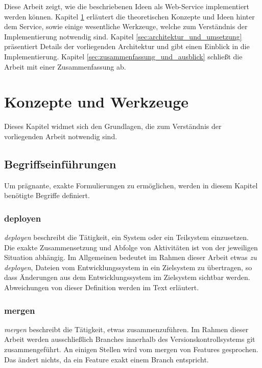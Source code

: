 Diese Arbeit zeigt, wie die beschriebenen Ideen als Web-Service implementiert werden können. Kapitel \ref{sec:konzepte_und_werkzeuge} erläutert die theoretischen Konzepte und Ideen hinter dem Service, sowie einige wesentliche Werkzeuge, welche zum Verständnis der Implementierung notwendig sind. Kapitel \ref{sec:architektur_und_umsetzung} präsentiert Details der vorliegenden Architektur und gibt einen Einblick in die Implementierung. Kapitel \ref{sec:zusammenfassung_und_ausblick} schließt die Arbeit mit einer Zusammenfassung ab.


\section{Konzepte und Werkzeuge} %
\label{sec:konzepte_und_werkzeuge}

Dieses Kapitel widmet sich den Grundlagen, die zum Verständnis der vorliegenden Arbeit notwendig sind.

\subsection{Begriffseinführungen} %
\label{sub:begriffseinfuehrungen}

Um prägnante, exakte Formulierungen zu ermöglichen, werden in diesem Kapitel benötigte Begriffe definiert.

\subsubsection{deployen} %
\label{ssub:deployen}
\emph{deployen} beschreibt die Tätigkeit, ein System oder ein Teilsystem einzusetzen. Die exakte Zusammensetzung und Abfolge von Aktivitäten ist von der jeweiligen Situation abhängig. Im Allgemeinen bedeutet im Rahmen dieser Arbeit etwas \emph{zu deployen}, Dateien vom Entwicklungssystem in ein Zielsystem zu übertragen, so dass Änderungen aus dem Entwicklungssystem im Zielsystem sichtbar werden. Abweichungen von dieser Definition werden im Text erläutert.

\subsubsection{mergen} %
\label{ssub:mergen}
\emph{mergen} beschreibt die Tätigkeit, etwas zusammenzuführen. Im Rahmen dieser Arbeit werden ausschließlich Branches innerhalb des Versionskontrollsystems git zusammengeführt. An einigen Stellen wird vom mergen von Features gesprochen. Das ändert nichts, da ein Feature exakt einem Branch entspricht.

